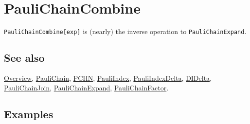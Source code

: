 \documentclass[../FeynCalcManual.tex]{subfiles}
\begin{document}
\hypertarget{paulichaincombine}{
\section{PauliChainCombine}\label{paulichaincombine}}

\texttt{PauliChainCombine[\allowbreak{}exp]} is (nearly) the inverse
operation to \texttt{PauliChainExpand}.

\subsection{See also}

\hyperlink{toc}{Overview}, \hyperlink{paulichain}{PauliChain},
\hyperlink{pchn}{PCHN}, \hyperlink{pauliindex}{PauliIndex},
\hyperlink{pauliindexdelta}{PauliIndexDelta},
\hyperlink{didelta}{DIDelta},
\hyperlink{paulichainjoin}{PauliChainJoin},
\hyperlink{paulichainexpand}{PauliChainExpand},
\hyperlink{paulichainfactor}{PauliChainFactor}.

\subsection{Examples}
\end{document}
